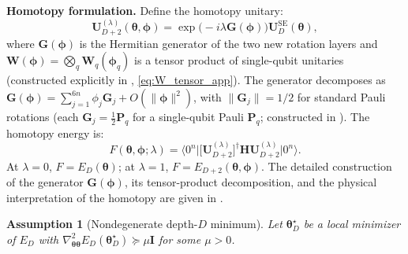 \documentclass[11pt]{article}
\theoremstyle{plain}
\newtheorem{assumption}[theorem]{Assumption}
\theoremstyle{plain}
\begin{document}
\medskip\noindent\textbf{Homotopy formulation.}
Define the homotopy unitary:
\begin{equation}\label{eq:homotopy}
  \mathbf{U}_{D+2}^{(\lambda)}(\bm\theta,\bm\phi)
  =\exp\bigl({-}i\lambda \mathbf{G}(\bm\phi)\bigr) 
   \mathbf{U}_D^{\mathrm{SE}}(\bm\theta),
\end{equation}
where $\mathbf{G}(\bm\phi)$ is the Hermitian generator of the two new rotation
layers and $\mathbf{W}(\bm\phi)=\bigotimes_q \mathbf{W}_q(\bm\phi_q)$ is a tensor
product of single-qubit unitaries (constructed explicitly in
, \eqref{eq:W_tensor_app}).
The generator decomposes as
$\mathbf{G}(\bm\phi)=\sum_{j=1}^{6n}\phi_j \mathbf{G}_j+O(\|\bm\phi\|^2)$,
with $\|\mathbf{G}_j\|=1/2$ for standard Pauli rotations (each
$\mathbf{G}_j=\tfrac12\mathbf{P}_q$ for a single-qubit Pauli $\mathbf{P}_q$;
constructed in ).
The homotopy energy is:
\begin{equation}\label{eq:F_homotopy}
  F(\bm\theta,\bm\phi;\lambda)
  =\bigl\langle 0^n\bigr|
   \bigl[\mathbf{U}_{D+2}^{(\lambda)}\bigr]^{\dagger}
   \mathbf{H} 
   \mathbf{U}_{D+2}^{(\lambda)}
   \bigl|0^n\bigr\rangle.
\end{equation}
At $\lambda=0$, $F=E_D(\bm\theta)$; at $\lambda=1$,
$F=E_{D+2}(\bm\theta,\bm\phi)$.
The detailed construction of the generator $\mathbf{G}(\bm\phi)$, its
tensor-product decomposition, and the physical interpretation of the
homotopy are given in .
\begin{assumption}[Nondegenerate depth-$D$ minimum]
\label{ass:nondegen}
  Let $\bm\theta_D^\star$ be a local minimizer of $E_D$ with
  $\nabla^2_{\bm\theta\bm\theta}E_D(\bm\theta_D^\star)
  \succeq\mu \mathbf{I}$ for some $\mu>0$.
\end{assumption}
\end{document}
